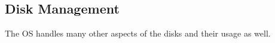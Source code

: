 \subsection{Disk Management}\label{subsec:Disk_Management}
The OS handles many other aspects of the disks and their usage as well.


